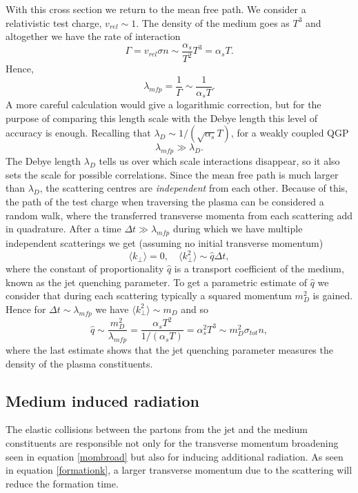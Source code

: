 \documentclass[a4paper,12pt]{article}
\numberwithin{equation}{section}
\begin{document}
With this cross section we return to the mean free path. We consider a relativistic test charge, $v_{rel}\sim 1$. The density of the medium goes as $T^3$ and altogether we have the rate of interaction
\begin{equation}
\Gamma = v_{rel}\sigma n \sim \frac{\alpha_s}{T^2}T^3= \alpha_sT.
\end{equation}
Hence,
\begin{equation}
\lambda_{mfp}=\frac{1}{\Gamma}\sim \frac{1}{\alpha_sT}.
\end{equation}
A more careful calculation would give a logarithmic correction, but for the purpose of comparing this length scale with the Debye length this level of accuracy is enough. Recalling that $\lambda_D\sim 1/(\sqrt{\alpha_s}T)$, for a weakly coupled QGP
\begin{equation}
\lambda_{mfp}\gg\lambda_D.
\end{equation}
The Debye length $\lambda_D$ tells us over which scale interactions disappear, so it also sets the scale for possible correlations. Since the mean free path is much larger than $\lambda_D$, the scattering centres are \emph{independent} from each other. Because of this, the path of the test charge when traversing the plasma can be considered a random walk, where the transferred transverse momenta from each scattering add in quadrature. After a time $\Delta t \gg \lambda_{mfp}$ during which we have multiple independent scatterings we get (assuming no initial transverse momentum)
\begin{equation}\label{mombroad}
\langle k_\perp \rangle = 0, \quad \langle k_\perp^2 \rangle \sim \hat{q}\Delta t,
\end{equation}
where the constant of proportionality $\hat{q}$ is a transport coefficient of the medium, known as the jet quenching parameter. To get a parametric estimate of $\hat{q}$ we consider that during each scattering typically a squared momentum $m_D^2$ is gained. Hence for $\Delta t \sim \lambda_{mfp}$ we have $\langle k_\perp^2 \rangle \sim m_D$ and so
\begin{equation}
\hat{q}\sim \frac{m_D^2}{\lambda_{mfp}}=\frac{\alpha_s T^2}{1/(\alpha_s T)}=\alpha_s^2 T^3\sim m_D^2 \sigma_{tot} n,
\end{equation}
where the last estimate shows that the jet quenching parameter measures the density of the plasma constituents.


\subsection{Medium induced radiation}\label{mediuminduced}
The elastic collisions between the partons from the jet and the medium constituents are responsible not only for the transverse momentum broadening seen in equation \eqref{mombroad} but also for inducing additional radiation. As seen in equation \eqref{formationk}, a larger transverse momentum due to the scattering will reduce the formation time.
\end{document}
